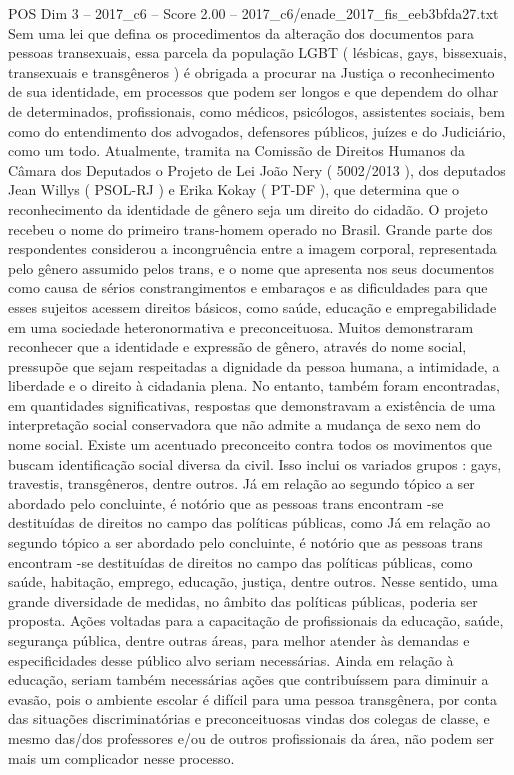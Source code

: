 \begin{textsample}{POS Dim 3 – 2017\_c6 – Score 2.00 – 2017\_c6/enade\_2017\_fis\_eeb3bfda27.txt}
Sem uma lei que defina os procedimentos da alteração dos documentos para pessoas transexuais, essa parcela da população LGBT ( lésbicas, gays, bissexuais, transexuais e transgêneros ) é obrigada a procurar na Justiça o reconhecimento de sua identidade, em processos que podem ser longos e que dependem do olhar de determinados, profissionais, como médicos, psicólogos, assistentes sociais, bem como do entendimento dos advogados, defensores públicos, juízes e do Judiciário, como um todo.
Atualmente, tramita na Comissão de Direitos Humanos da Câmara dos Deputados o Projeto de Lei João Nery ( 5002/2013 ), dos deputados Jean Willys ( PSOL-RJ ) e Erika Kokay ( PT-DF ), que determina que o reconhecimento da identidade de gênero seja um direito do cidadão.
O projeto recebeu o nome do primeiro trans-homem operado no Brasil.
Grande parte dos respondentes considerou a incongruência entre a imagem corporal, representada pelo gênero assumido pelos trans, e o nome que apresenta nos seus documentos como causa de sérios constrangimentos e embaraços e as dificuldades para que esses sujeitos acessem direitos básicos, como saúde, educação e empregabilidade em uma sociedade heteronormativa e preconceituosa.
Muitos demonstraram reconhecer que a identidade e expressão de gênero, através do nome social, pressupõe que sejam respeitadas a dignidade da pessoa humana, a intimidade, a liberdade e o direito à cidadania plena.
No entanto, também foram encontradas, em quantidades significativas, respostas que demonstravam a existência de uma interpretação social conservadora que não admite a mudança de sexo nem do nome social.
Existe um acentuado preconceito contra todos os movimentos que buscam identificação social diversa da civil.
Isso inclui os variados grupos : gays, travestis, transgêneros, dentre outros.
Já em relação ao segundo tópico a ser abordado pelo concluinte, é notório que as pessoas trans encontram -se destituídas de direitos no campo das políticas públicas, como Já em relação ao segundo tópico a ser abordado pelo concluinte, é notório que as pessoas trans encontram -se destituídas de direitos no campo das políticas públicas, como saúde, habitação, emprego, educação, justiça, dentre outros.
Nesse sentido, uma grande diversidade de medidas, no âmbito das políticas públicas, poderia ser proposta.
Ações voltadas para a capacitação de profissionais da educação, saúde, segurança pública, dentre outras áreas, para melhor atender às demandas e especificidades desse público alvo seriam necessárias.
Ainda em relação à educação, seriam também necessárias ações que contribuíssem para diminuir a evasão, pois o ambiente escolar é difícil para uma pessoa transgênera, por conta das situações discriminatórias e preconceituosas vindas dos colegas de classe, e mesmo das/dos professores e/ou de outros profissionais da área, não podem ser mais um complicador nesse processo.

\end{textsample}
